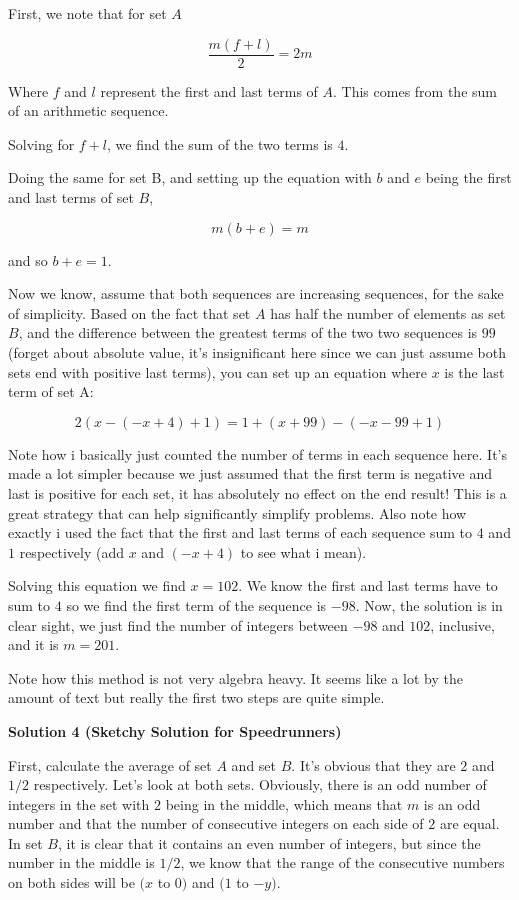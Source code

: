 \begin{enumerate}
 First, we note that for set $A$

 \[\frac{m(f + l)}{2} = 2m\]

 Where $f$ and $l$ represent the first and last terms of $A$.  This comes from the sum of an arithmetic sequence.

 Solving for $f+l$, we find the sum of the two terms is $4$.

 Doing the same for set B, and setting up the equation with $b$ and $e$ being the first and last terms of set $B$, 

 
 \[m(b+e) = m\]

 and so $b+e = 1$.

 Now we know, assume that both sequences are increasing sequences, for the sake of simplicity.  Based on the fact that set $A$ has half the number of elements as set $B$, and the difference between the greatest terms of the two two sequences is $99$ (forget about absolute value, it's insignificant here since we can just assume both sets end with positive last terms), you can set up an equation where $x$ is the last term of set A:

 
 \[2(x-(-x+4)+1) = 1+(x+99)-(-x-99+1)\]

 Note how i basically just counted the number of terms in each sequence here.  It's made a lot simpler because we just assumed that the first term is negative and last is positive for each set, it has absolutely no effect on the end result!  This is a great strategy that can help significantly simplify problems.  Also note how exactly i used the fact that the first and last terms of each sequence sum to $4$ and $1$ respectively (add $x$ and $(-x+4)$ to see what i mean).

 Solving this equation we find $x = 102$.  We know the first and last terms have to sum to $4$ so we find the first term of the sequence is $-98$.  Now, the solution is in clear sight, we just find the number of integers between $-98$ and $102$, inclusive, and it is $m = \boxed{201}$.

 Note how this method is not very algebra heavy.  It seems like a lot by the amount of text but really the first two steps are quite simple.

 



\textbf{Solution 4 (Sketchy Solution for Speedrunners)}

First, calculate the average of set $A$ and set $B$. It's obvious that they are $2$ and $1/2$ respectively. Let's look at both sets. Obviously, there is an odd number of integers in the set with $2$ being in the middle, which means that $m$ is an odd number and that the number of consecutive integers on each side of $2$ are equal. In set $B$, it is clear that it contains an even number of integers, but since the number in the middle is $1/2$, we know that the range of the consecutive numbers on both sides will be $(x$ to $0)$ and $(1$ to $-y)$. 


\end{enumerate}
